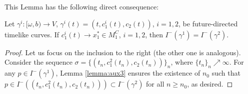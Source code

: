 \noindent This Lemma has the following direct consequence:

\begin{lemma}\label{lemma:aux1}
 Let $\gamma^i:[\omega,b)\rightarrow V$, $\gamma^i(t)=(t,c_1^i(t),c_2(t))$, $i=1,2$, be future-directed timelike curves. If $c_1^i(t)\rightarrow x_1^*\in M^C_1$, $i=1,2$, then $I^-(\gamma^1)=I^-(\gamma^2)$.
\end{lemma}
\begin{proof}
 Let us focus on the inclusion to the right (the other one is analogous). Consider the sequence $\sigma=\{(t_n,c_1^2(t_n),c_2(t_n))\}_n$, where $\{t_n\}_n\nearrow \infty$. For any $p\in I^-(\gamma^1)$, Lemma \ref{lemma:aux3} ensures the existence of $n_0$ such that $p\in I^-((t_n,c_1^2(t_n),c_2(t_n)))\subset I^-(\gamma^2)$ for all $n\geq n_0$, as desired.
\end{proof}


